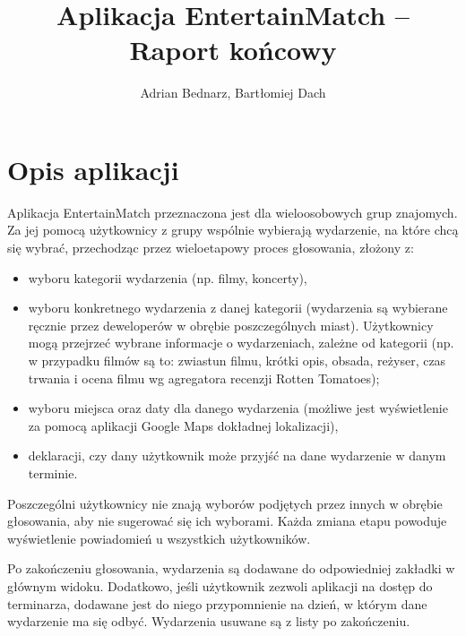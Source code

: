 \documentclass[10pt,a4paper]{article}
\title{Aplikacja EntertainMatch -- Raport końcowy}
\author{Adrian Bednarz, Bartłomiej Dach}
\begin{document}
\maketitle

\section{Opis aplikacji}

Aplikacja EntertainMatch przeznaczona jest dla wieloosobowych grup znajomych.
Za jej pomocą użytkownicy z grupy wspólnie wybierają wydarzenie, na które chcą się wybrać,
przechodząc przez wieloetapowy proces głosowania, złożony z:

\begin{itemize}
	\item wyboru kategorii wydarzenia (np. filmy, koncerty),
	\item wyboru konkretnego wydarzenia z danej kategorii (wydarzenia są wybierane ręcznie przez
		deweloperów w obrębie poszczególnych miast). Użytkownicy mogą przejrzeć wybrane
		informacje o wydarzeniach, zależne od kategorii (np. w przypadku filmów są to:
		zwiastun filmu, krótki opis, obsada, reżyser, czas trwania i ocena filmu wg agregatora
		recenzji Rotten Tomatoes);
	\item wyboru miejsca oraz daty dla danego wydarzenia (możliwe jest wyświetlenie za pomocą
		aplikacji Google Maps dokładnej lokalizacji),
	\item deklaracji, czy dany użytkownik może przyjść na dane wydarzenie w danym terminie.
\end{itemize}

Poszczególni użytkownicy nie znają wyborów podjętych przez innych w obrębie głosowania, aby nie
sugerować się ich wyborami.
Każda zmiana etapu powoduje wyświetlenie powiadomień u wszystkich użytkowników.

Po zakończeniu głosowania, wydarzenia są dodawane do odpowiedniej zakładki w głównym widoku.
Dodatkowo, jeśli użytkownik zezwoli aplikacji na dostęp do terminarza, dodawane jest do niego
przypomnienie na dzień, w którym dane wydarzenie ma się odbyć.
Wydarzenia usuwane są z listy po zakończeniu.
\end{document}
